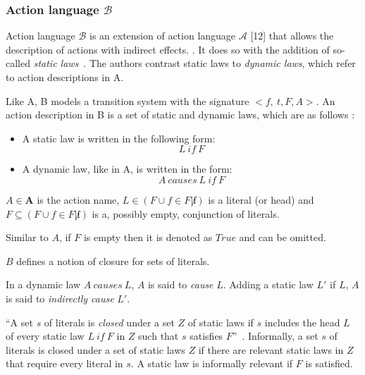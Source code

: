 \subsubsection{Action language $ \mathcal{B} $}
\label{subsubsec:action_language_b}

Action language $ \mathcal{B} $ is an extension of action language $ \mathcal{A} $ [12] that allows the description of actions with indirect effects.
\cite{gelfond_action_1998}.
It does so with the addition of so-called \textit{static laws}~\cite{gelfond_action_1998}.
The authors contrast static laws to \textit{dynamic laws}, which refer to action descriptions in A.

Like A, B models a transition system with the signature $<{f,\ t},F,A>$.
An action description in B is a set of static and dynamic laws, which are as follows \cite{gelfond_action_1998}:

\begin{itemize}
    \item A static law is written in the following form:
        $$
        L\ if\ F
        $$

    \item A dynamic law, like in A, is written in the form:
        $$
        A\ causes\ L\ if\ F
        $$
\end{itemize}

$A \in \boldsymbol{A}$ is the action name, $L \in(F \cup{f \in F| \not f})$ is a literal (or head) and $F \subseteq(F \cup{f \in F| \not f})$ is a, possibly empty, conjunction of literals.

Similar to $A$, if $F$ is empty then it is denoted as $True$ and can be omitted.

$B$ defines a notion of closure for sets of literals.

\begin{definition}
    In a dynamic law $A \ causes \ L$, $A$ is said to \textit{cause} $L$.
    Adding a static law $L'$ if $L$, $A$ is said to \textit{indirectly cause} $L'$.
\end{definition}

\begin{definition}
    ``A set $s$ of literals is \textit{closed} under a set $Z$ of static laws if $s$ includes the head $L$ of every static law $L\ if\ F$ in $Z$ such that $s$ satisfies $F$''~\cite{gelfond_action_1998}.
    Informally, a set $s$ of literals is closed under a set of static laws $Z$ if there are relevant static laws in $Z$ that require every literal in $s$.
    A static law is informally relevant if $F$ is satisfied.
\end{definition}

